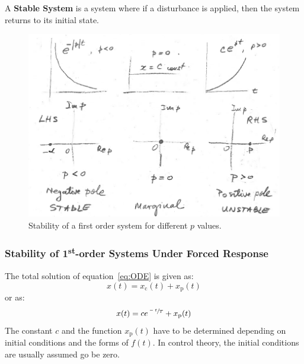 \documentclass[12pt,letter]{article}
\begin{document}
\begin{mdframed}[middlelinewidth=0.5mm]
\begin{center}
\end{center}
A \textbf{Stable System} is a system where if a disturbance is applied, then the system returns to its initial state. 
\end{mdframed}

\begin{figure}[H]
	\centering
	\includegraphics[width=6.5in]{../figures/system_stability_first_order.png}
	\caption{Stability of a first order system for different $p$ values.}
\end{figure}


\subsubsection{Stability of 1\textsuperscript{st}-order Systems Under Forced Response}


The total solution of equation~\ref{eq:ODE} is given as:
\begin{equation}
x(t) = x_\text{c}(t)+x_\text{p}(t)
\end{equation}
or as:
\begin{equation}
x(t) = c e^{ \sfrac{-t}{T}} + x_\text{p}(t)
\end{equation}
The constant $c$ and the function $x_\text{p}(t)$ have to be determined depending on initial conditions and the forms of $f(t)$. In control theory, the initial conditions are usually assumed go be zero. 

\end{document}
